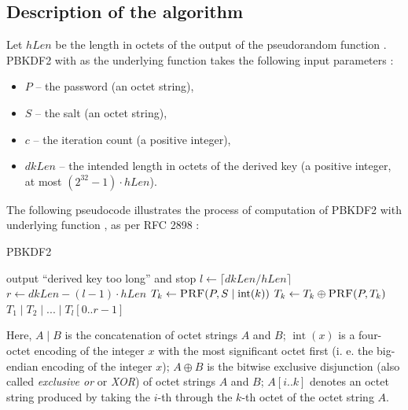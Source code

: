 \documentclass[12pt,oneside]{fithesis2}
\begin{document}
      \subsection{Description of the algorithm}
      Let $hLen$ be the length in octets of the output of the pseudorandom function . PBKDF2 with  as the underlying function takes the following input parameters \cite{rfc2898}:
      \begin{itemize}
        \item $P$ -- the password (an octet string),
        \item $S$ -- the salt (an octet string),
        \item $c$ -- the iteration count (a positive integer),
        \item $dkLen$ -- the intended length in octets of the derived key (a positive integer, at most $(2^{32} - 1) \cdot hLen$).
      \end{itemize}
      
      The following pseudocode illustrates the process of computation of PBKDF2 with underlying function , as per RFC 2898 \cite{rfc2898}:
      \begin{algorithm}[H]
        \caption{PBKDF2}
        \begin{algorithmic}[1]
              \State output ``derived key too long'' and
         stop
            \EndIf
            \State $l \gets \lceil dkLen / hLen\rceil$ 
            \State $r \gets dkLen - (l - 1) \cdot hLen$ 
              \State $T_k \gets \Call{PRF}{P, S \mid \operatorname{int}(k)}$
                \State $T_k \gets T_k \oplus \Call{PRF}{P, T_k}$
              \EndFor
            \EndFor
            \State \Return $T_1 \mid T_2 \mid ... \mid T_l[0..r - 1]$
          \EndFunction
        \end{algorithmic}
      \end{algorithm}
      
      Here, $A \mid B$ is the concatenation of octet strings $A$ and $B$; $\operatorname{int}(x)$ is a four-octet encoding of the integer $x$ with the most significant octet first (i. e. the big-endian encoding of the integer $x$); $A \oplus B$ is the bitwise exclusive disjunction (also called \emph{exclusive or} or \emph{XOR}) of octet strings $A$ and $B$; $A[i..k]$ denotes an octet string produced by taking the $i$-th through the $k$-th octet of the octet string $A$.
      
\end{document}
